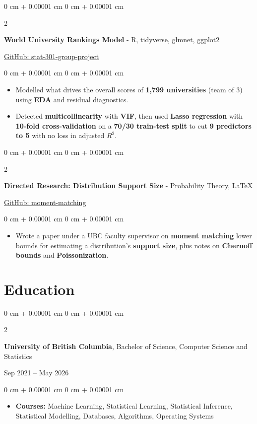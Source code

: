 \documentclass[9pt, letterpaper]{extarticle}
\newenvironment{highlights}{
    \begin{itemize}[
        topsep=0.10 cm,
        parsep=0.10 cm,
        partopsep=0pt,
        itemsep=0pt,
        leftmargin=0 cm + 10pt
    ]
}{
    \end{itemize}
} %
\newenvironment{onecolentry}{
    \begin{adjustwidth}{
        0 cm + 0.00001 cm
    }{
        0 cm + 0.00001 cm
    }
}{
    \end{adjustwidth}
} %
\newenvironment{twocolentry}[2][]{
    \onecolentry
    \def\secondColumn{#2}
    \setcolumnwidth{\fill, 4.5 cm}
    \begin{paracol}{2}
}{
    \switchcolumn \raggedleft \secondColumn
    \end{paracol}
    \endonecolentry
} %
\begin{document}
        \vspace{0.2 cm}

        \begin{twocolentry}
        {\href{https://github.com/ayushtvora/stat-301-group-project}{GitHub: stat-301-group-project}}
            \textbf{World University Rankings Model} - R, tidyverse, glmnet, ggplot2
        \end{twocolentry}
        \vspace{0.10 cm}
        \begin{onecolentry}
            \begin{highlights}
                \item Modelled what drives the overall scores of \textbf{1,799 universities} (team of 3) using \textbf{EDA} and residual diagnostics.
                \item Detected \textbf{multicollinearity} with \textbf{VIF}, then used \textbf{Lasso regression} with \textbf{10-fold cross-validation} on a \textbf{70/30 train-test split} to cut \textbf{9 predictors to 5} with no loss in adjusted $R^2$.
            \end{highlights}
        \end{onecolentry}

        \vspace{0.2 cm}

        \begin{twocolentry}
        {\href{https://github.com/ayushtvora/moment-matching}{GitHub: moment-matching}}
            \textbf{Directed Research: Distribution Support Size} - Probability Theory, LaTeX
        \end{twocolentry}
        \vspace{0.10 cm}
        \begin{onecolentry}
            \begin{highlights}
                \item Wrote a paper under a UBC faculty supervisor on \textbf{moment matching} lower bounds for estimating a distribution's \textbf{support size}, plus notes on \textbf{Chernoff bounds} and \textbf{Poissonization}.
            \end{highlights}
        \end{onecolentry}
    \section{Education}
        \begin{twocolentry}{Sep 2021 – May 2026}
            \textbf{University of British Columbia}, Bachelor of Science, Computer Science and Statistics
        \end{twocolentry}
        \vspace{0.10 cm}
        \begin{onecolentry}
            \begin{highlights}
                \item \textbf{Courses:} Machine Learning, Statistical Learning, Statistical Inference, Statistical Modelling, Databases, Algorithms, Operating Systems
            \end{highlights}
        \end{onecolentry}
\end{document}
